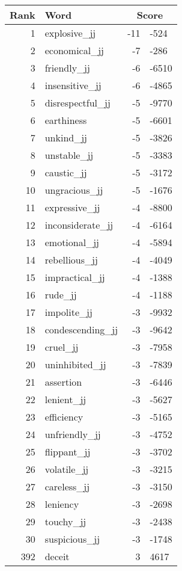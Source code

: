 \begin{longtable}[!htbp]{| rlr@{.}l |}
    \hline
    \textbf{Rank} & \textbf{Word} & \multicolumn{2}{c|}{\textbf{Score}} \\
    \hline
    \endhead
    1 & explosive\_jj & -11 & -524 \\
    2 & economical\_jj & -7 & -286 \\
    3 & friendly\_jj & -6 & -6510 \\
    4 & insensitive\_jj & -6 & -4865 \\
    5 & disrespectful\_jj & -5 & -9770 \\
    6 & earthiness & -5 & -6601 \\
    7 & unkind\_jj & -5 & -3826 \\
    8 & unstable\_jj & -5 & -3383 \\
    9 & caustic\_jj & -5 & -3172 \\
    10 & ungracious\_jj & -5 & -1676 \\
    11 & expressive\_jj & -4 & -8800 \\
    12 & inconsiderate\_jj & -4 & -6164 \\
    13 & emotional\_jj & -4 & -5894 \\
    14 & rebellious\_jj & -4 & -4049 \\
    15 & impractical\_jj & -4 & -1388 \\
    16 & rude\_jj & -4 & -1188 \\
    17 & impolite\_jj & -3 & -9932 \\
    18 & condescending\_jj & -3 & -9642 \\
    19 & cruel\_jj & -3 & -7958 \\
    20 & uninhibited\_jj & -3 & -7839 \\
    21 & assertion & -3 & -6446 \\
    22 & lenient\_jj & -3 & -5627 \\
    23 & efficiency & -3 & -5165 \\
    24 & unfriendly\_jj & -3 & -4752 \\
    25 & flippant\_jj & -3 & -3702 \\
    26 & volatile\_jj & -3 & -3215 \\
    27 & careless\_jj & -3 & -3150 \\
    28 & leniency & -3 & -2698 \\
    29 & touchy\_jj & -3 & -2438 \\
    30 & suspicious\_jj & -3 & -1748 \\
    392 & deceit & 3 & 4617 \\

\end{longtable}
